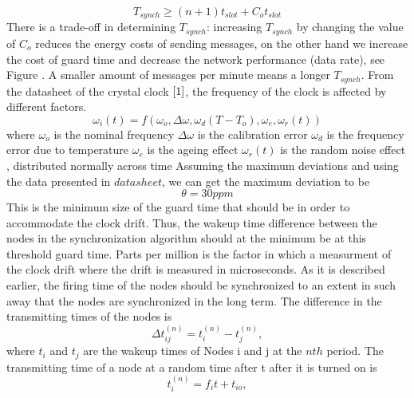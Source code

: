\documentclass[a4paper,8pt]{report}
\begin{document}
\begin{equation}
T_{synch} \geq (n+1)t_{slot} + C_ot_{slot}
\end{equation}
There is a trade-off in determining $T_{synch}$: increasing
$T_{synch}$ by changing the value of $C_o$ reduces the energy costs
of sending messages, on the other hand we increase the cost of guard
time and decrease the network performance (data rate), see Figure .
A smaller amount of messages per minute means a longer $T_{synch}$.
\newline From the datasheet of the crystal clock $\cite{1}$,
the frequency of the clock is affected by different factors.
\begin{equation}
\omega_i(t) = f(\omega_o,\Delta \omega ,\omega_d(T-T_o),\omega_e,
\omega_r(t))
\end{equation}
where \newline $\omega_o$ is the nominal frequency \newline $\Delta
\omega$ is the calibration error \newline $\omega_d$ is the
frequency error due to temperature \newline $\omega_e$ is the ageing
effect \newline $\omega_r(t)$ is the random noise effect ,
distributed normally across time \newline Assuming the maximum
deviations and using the data presented in $datasheet$, we can get
the maximum deviation to be
\begin{equation}
\theta = 30 ppm
\end{equation}
This is the minimum size of the guard time that should be in order
to accommodate the clock drift. Thus, the wakeup time difference
between the nodes in the synchronization algorithm should at the
minimum be at this threshold guard time.
\newline
Parts per million is the factor in which a measurment of the clock drift where
the drift is measured in microseconds.
\newpage
As it is described earlier, the firing time of the nodes should be
synchronized to an extent in such away that the nodes are
synchronized in the long term. The difference in the transmitting
times of the nodes is
\begin{equation}
\Delta t_{ij}^{(n)} = t_i^{(n)} - t_j^{(n)} ,
\end{equation}
where $t_i$ and $t_j$ are the wakeup times of Nodes i and j at the
$nth$ period. The transmitting time of a node at a random time after
t after it is turned on is
\begin{equation}
t_i^{(n)} =  f_it + t_{io},
\end{equation}
\end{document}
